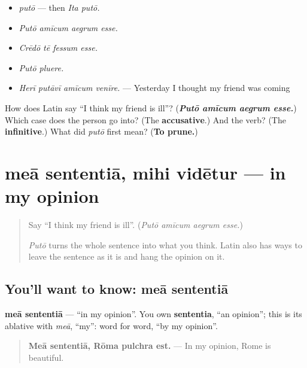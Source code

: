 \begin{itemize}
\raggedright
  \item \emph{putō} — then \emph{Ita putō.}
  \item \emph{Putō amīcum aegrum esse.}
  \item \emph{Crēdō tē fessum esse.}
  \item \emph{Putō pluere.}
  \item \emph{Herī putāvī amīcum venīre.} — Yesterday I thought my friend was coming
\end{itemize}

\begin{tcolorbox}[breakable,colback=teal!4,colframe=teal!35!black,title={Before you move on}]
How does Latin say \textquotedblleft{}I think my friend is ill\textquotedblright{}? (\emph{\textbf{Putō amīcum aegrum esse.}}) Which case does the person go into? (The \textbf{accusative}.) And the verb? (The \textbf{infinitive}.) What did \emph{putō} first mean? (\textbf{To prune.})
\end{tcolorbox}
\section[meā sententiā, mihi vidētur]{meā sententiā, mihi vidētur — in my opinion}

\label{lesson:LA-C283-mea-sententia}



\begin{quote}
Say \textquotedblleft{}I think my friend is ill\textquotedblright{}. (\emph{Putō amīcum aegrum esse.})

\emph{Putō} turns the whole sentence into what you think. Latin also has ways to leave the sentence as it is and hang the opinion on it.
\end{quote}

\subsection*{You'll want to know: meā sententiā}
\textbf{meā sententiā} — \textquotedblleft{}in my opinion\textquotedblright{}. You own \textbf{sententia}, \textquotedblleft{}an opinion\textquotedblright{}; this is its ablative with \emph{meā}, \textquotedblleft{}my\textquotedblright{}: word for word, \textquotedblleft{}by my opinion\textquotedblright{}.

\begin{quote}
\textbf{Meā sententiā, Rōma pulchra est.} — In my opinion, Rome is beautiful.
\end{quote}


